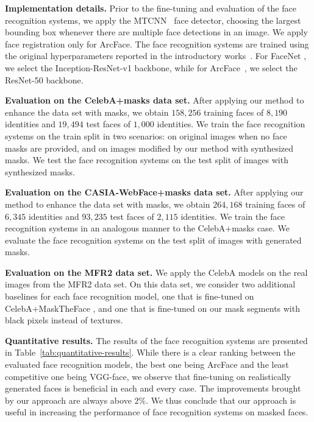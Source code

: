 \documentclass{article}
\begin{document}
{\bf Implementation details.} Prior to the fine-tuning and evaluation of the face recognition systems, we apply the MTCNN~\cite{zhang2016spl} face detector, choosing the largest bounding box whenever there are multiple face detections in an image. We apply face registration only for ArcFace. The face recognition systems are trained using the original hyperparameters reported in the introductory works~\cite{Schroff15CVPR,Deng19CVPR,Parkhi15BMVC}. For FaceNet \cite{Schroff15CVPR}, we select the Inception-ResNet-v1 backbone, while for ArcFace~\cite{Deng19CVPR}, we select the ResNet-50 backbone.



{\bf Evaluation on the CelebA+masks data set.} After applying our method to enhance the data set with masks, we obtain $158,256$ training faces of $8,190$ identities and $19,494$ test faces of $1,000$ identities. We train the face recognition systems on the train split in two scenarios: on original images when no face masks are provided, and on images modified by our method with synthesized masks. We test the face recognition systems on the test split of images with synthesized masks.

{\bf Evaluation on the CASIA-WebFace+masks data set.} After applying our method to enhance the data set with masks, we obtain $264,168$ training faces of $6,345$ identities and $93,235$ test faces of $2,115$ identities. We train the face recognition systems in an analogous manner to the CelebA+masks case. We evaluate the face recognition systems on the test split of images with generated masks.

{\bf Evaluation on the MFR2 data set.}
We apply the CelebA models on the real images from the MFR2 \cite{anwar2020arxiv} data set. On this data set, we consider two additional baselines for each face recognition model, one that is fine-tuned on CelebA+MaskTheFace \cite{anwar2020arxiv}, and one that is fine-tuned on our mask segments with black pixels instead of textures.

{\bf Quantitative results.} 
The results of the face recognition systems are presented in Table~\ref{tab:quantitative-results}. While there is a clear ranking between the evaluated face recognition models, the best one being ArcFace and the least competitive one being VGG-face, we observe that fine-tuning on realistically generated faces is beneficial in each and every case. The improvements brought by our approach are always above $2\%$. We thus conclude that our approach is useful in increasing the performance of face recognition systems on masked faces.
\end{document}
